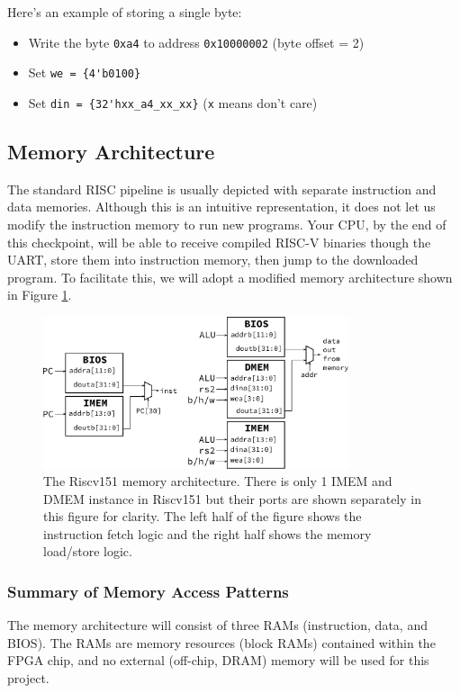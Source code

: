 \documentclass[11pt]{article}
\begin{document}
Here's an example of storing a single byte:
\begin{itemize}
  \item Write the byte \verb|0xa4| to address \verb|0x10000002| (byte offset = 2)
  \item Set \verb|we = {4'b0100}|
  \item Set \verb|din = {32'hxx_a4_xx_xx}| (\verb|x| means don't care)
\end{itemize}

\subsection{Memory Architecture}
The standard RISC pipeline is usually depicted with separate instruction and data memories.
Although this is an intuitive representation, it does not let us modify the instruction memory to run new programs.
Your CPU, by the end of this checkpoint, will be able to receive compiled RISC-V binaries though the UART, store them into instruction memory, then jump to the downloaded program.
To facilitate this, we will adopt a modified memory architecture shown in Figure \ref{fig:mem_arch}.

\begin{figure}[hbt]
  \begin{center}
    \includegraphics[width=0.8\textwidth]{images/memory_arch.pdf}
    \caption{The Riscv151 memory architecture. There is only 1 IMEM and DMEM instance in Riscv151 but their ports are shown separately in this figure for clarity. The left half of the figure shows the instruction fetch logic and the right half shows the memory load/store logic.}
    \label{fig:mem_arch}
  \end{center}
\end{figure}

\subsubsection{Summary of Memory Access Patterns}
The memory architecture will consist of three RAMs (instruction, data, and BIOS).
The RAMs are memory resources (block RAMs) contained within the FPGA chip, and no external (off-chip, DRAM) memory will be used for this project.
\end{document}
